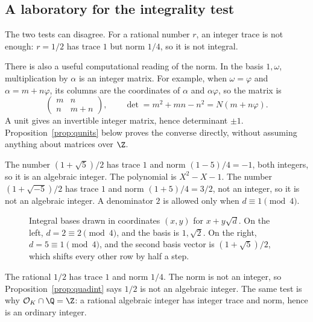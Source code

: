 \subsection*{A laboratory for the integrality test}
The two tests can disagree. For a rational number $r$, an integer trace is not enough:
$r=1/2$ has trace $1$ but norm $1/4$, so it is not integral.

There is also a useful computational reading of the norm. In the basis
$1,\omega$, multiplication by $\alpha$ is an integer matrix. For example, when
$\omega=\varphi$ and $\alpha=m+n\varphi$, its columns are the coordinates of
$\alpha$ and $\alpha\varphi$, so the matrix is
\[
\begin{pmatrix}m&n\\ n&m+n\end{pmatrix},\qquad
\det=m^2+mn-n^2=N(m+n\varphi).
\]
A unit gives an invertible integer matrix, hence determinant $\pm1$.
Proposition~\ref{prop:qunits} below proves the converse directly, without
assuming anything about matrices over $\Z$.

\begin{examplex}
The number $(1+\sqrt 5)/2$ has trace $1$ and norm $(1-5)/4=-1$, both integers, so it is an algebraic integer. The polynomial is $X^2-X-1$. The number $(1+\sqrt{-5})/2$ has trace $1$ and norm $(1+5)/4=3/2$, not an integer, so it is not an algebraic integer. A denominator $2$ is allowed only when $d\equiv 1\pmod 4$.
\end{examplex}

\begin{figure}[ht]
\centering
{}
\caption{Integral bases drawn in coordinates $(x,y)$ for $x+y\sqrt d$. On the left, $d=2\equiv 2\pmod 4$, and the basis is $1,\sqrt 2$. On the right, $d=5\equiv 1\pmod 4$, and the second basis vector is $(1+\sqrt 5)/2$, which shifts every other row by half a step.}
\label{fig:t1-bases}
\end{figure}

\begin{examplex}
The rational $1/2$ has trace $1$ and norm $1/4$. The norm is not an integer, so Proposition~\ref{prop:quadint} says $1/2$ is not an algebraic integer. The same test is why $\mathcal O_K\cap\Q=\Z$: a rational algebraic integer has integer trace and norm, hence is an ordinary integer.
\end{examplex}

